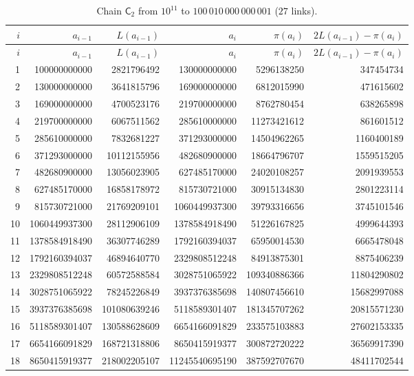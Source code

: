 \documentclass[11pt,a4paper]{article}
\theoremstyle{definition}
\begin{document}
{\begin{longtable}{rrrrrr}
\caption{Chain $\mathsf C_2$ from $10^{11}$ to $100\,010\,000\,000\,001$ ($27$ links).}\label{tab:chain2}\\
\toprule
$i$ & $a_{i-1}$ & $L(a_{i-1})$ & $a_{i}$ & $\pi(a_{i})$ & $2L(a_{i-1})-\pi(a_{i})$\\
\midrule
\endfirsthead
\toprule
$i$ & $a_{i-1}$ & $L(a_{i-1})$ & $a_{i}$ & $\pi(a_{i})$ & $2L(a_{i-1})-\pi(a_{i})$\\
\midrule
\endhead
1 & 100000000000 & 2821796492 & 130000000000 & 5296138250 & 347454734 \\
2 & 130000000000 & 3641815796 & 169000000000 & 6812015990 & 471615602 \\
3 & 169000000000 & 4700523176 & 219700000000 & 8762780454 & 638265898 \\
4 & 219700000000 & 6067511562 & 285610000000 & 11273421612 & 861601512 \\
5 & 285610000000 & 7832681227 & 371293000000 & 14504962265 & 1160400189 \\
6 & 371293000000 & 10112155956 & 482680900000 & 18664796707 & 1559515205 \\
7 & 482680900000 & 13056023905 & 627485170000 & 24020108257 & 2091939553 \\
8 & 627485170000 & 16858178972 & 815730721000 & 30915134830 & 2801223114 \\
9 & 815730721000 & 21769209101 & 1060449937300 & 39793316656 & 3745101546 \\
10 & 1060449937300 & 28112906109 & 1378584918490 & 51226167825 & 4999644393 \\
11 & 1378584918490 & 36307746289 & 1792160394037 & 65950014530 & 6665478048 \\
12 & 1792160394037 & 46894640770 & 2329808512248 & 84913875301 & 8875406239 \\
13 & 2329808512248 & 60572588584 & 3028751065922 & 109340886366 & 11804290802 \\
14 & 3028751065922 & 78245226849 & 3937376385698 & 140807456610 & 15682997088 \\
15 & 3937376385698 & 101080639246 & 5118589301407 & 181345707262 & 20815571230 \\
16 & 5118589301407 & 130588628609 & 6654166091829 & 233575103883 & 27602153335 \\
17 & 6654166091829 & 168721318806 & 8650415919377 & 300872720222 & 36569917390 \\
18 & 8650415919377 & 218002205107 & 11245540695190 & 387592707670 & 48411702544 \\

\end{longtable}}
\end{document}
